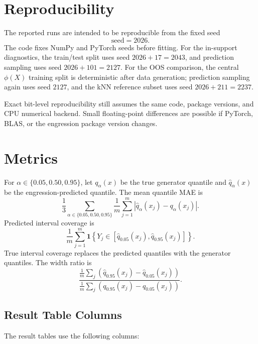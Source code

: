\documentclass[11pt]{article}
\begin{document}
\section{Reproducibility}

The reported runs are intended to be reproducible from the fixed seed
\[
  \text{seed}=2026.
\]
The code fixes NumPy and PyTorch seeds before fitting.  For the in-support
diagnostics, the train/test split uses seed \(2026+17=2043\), and prediction
sampling uses seed \(2026+101=2127\).  For the OOS comparison, the central
\(\phi(X)\) training split is deterministic after data generation; prediction
sampling again uses seed \(2127\), and the kNN reference subset uses seed
\(2026+211=2237\).

Exact bit-level reproducibility still assumes the same code, package versions,
and CPU numerical backend.  Small floating-point differences are possible if
PyTorch, BLAS, or the engression package version changes.

\section{Metrics}

For \(\alpha\in\{0.05,0.50,0.95\}\), let \(q_\alpha(x)\) be the true generator
quantile and \(\widehat{q}_\alpha(x)\) be the engression-predicted quantile.
The mean quantile MAE is
\[
  \frac{1}{3}\sum_{\alpha\in\{0.05,0.50,0.95\}}
  \frac{1}{m}\sum_{j=1}^{m}
  \left|\widehat{q}_\alpha(x_j)-q_\alpha(x_j)\right|.
\]
Predicted interval coverage is
\[
  \frac{1}{m}
  \sum_{j=1}^{m}
  \mathbf{1}\left\{
  Y_j\in[\widehat{q}_{0.05}(x_j),\widehat{q}_{0.95}(x_j)]
  \right\}.
\]
True interval coverage replaces the predicted quantiles with the generator
quantiles.  The width ratio is
\[
  \frac{
  \frac{1}{m}\sum_j
  \left(\widehat{q}_{0.95}(x_j)-\widehat{q}_{0.05}(x_j)\right)
  }{
  \frac{1}{m}\sum_j
  \left(q_{0.95}(x_j)-q_{0.05}(x_j)\right)
  }.
\]

\subsection{Result Table Columns}

The result tables use the following columns:
\end{document}
